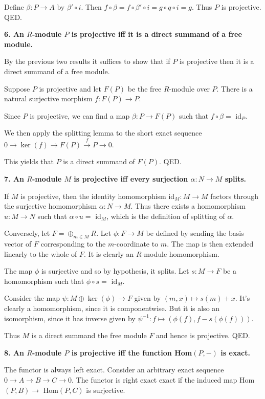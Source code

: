 \documentclass[12pt]{article}
\begin{document}
Define $\beta : P \to A$ by $\beta'\circ i$. Then $f\circ \beta = f\circ \beta'\circ i = g\circ q\circ i = g$. Thus $P$ is projective. QED.

\textbf{6. An $R$-module $P$ is projective iff it is a direct summand of a free module.}

By the previous two results it suffices to show that if $P$ is projective then it is a direct summand of a free module.

Suppose $P$ is projective and let $F(P)$ be the free $R$-module over $P$. There is a natural surjective morphism $f : F(P) \to P$.

Since $P$ is projective, we can find a map $\beta : P \to F(P)$ such that $f\circ \beta =$ id$_P$.

We then apply the splitting lemma to the short exact sequence $0 \rightarrow \ker(f) \rightarrow F(P) \overset{f}{\rightarrow} P \rightarrow 0$.

This yields that $P$ is a direct summand of $F(P)$. QED.

\textbf{7. An $R$-module $M$ is projective iff every surjection $\alpha : N \to M$ splits.}

If $M$ is projective, then the identity homomorphism id$_M : M \to M$ factors through the surjective homomorphism $\alpha : N \to M$. Thus there exists a homomorphism $u : M \to N$ such that $\alpha\circ u =$ id$_M$, which is the definition of splitting of $\alpha$.

Conversely, let $F = \oplus_{m \in M} R$. Let $\phi : F \to M$ be defined by sending the basis vector of $F$ corresponding to the $m$-coordinate to $m$. The map is then extended linearly to the whole of $F$. It is clearly an $R$-module homomorphism.

The map $\phi$ is surjective and so by hypothesis, it splits. Let $s : M \to F$ be a homomorphism such that $\phi\circ s =$ id$_M$. 

Consider the map $\psi : M \oplus \ker(\phi) \to F$ given by $(m, x) \mapsto s(m) + x$. It's clearly a homomorphism, since it is componentwise. But it is also an isomorphism, since it has inverse given by $\psi^{-1} : f \mapsto (\phi(f), f - s(\phi(f)))$.

Thus $M$ is a direct summand the free module $F$ and hence is projective. QED.

\textbf{8. An $R$-module $P$ is projective iff the function Hom$(P, -)$ is exact.}

The functor is always left exact. Consider an arbitrary exact sequence $0 \rightarrow A \rightarrow B \rightarrow C \rightarrow 0$. The functor is right exact exact if the induced map Hom$(P, B) \rightarrow$ Hom$(P, C)$ is surjective.
\end{document}
